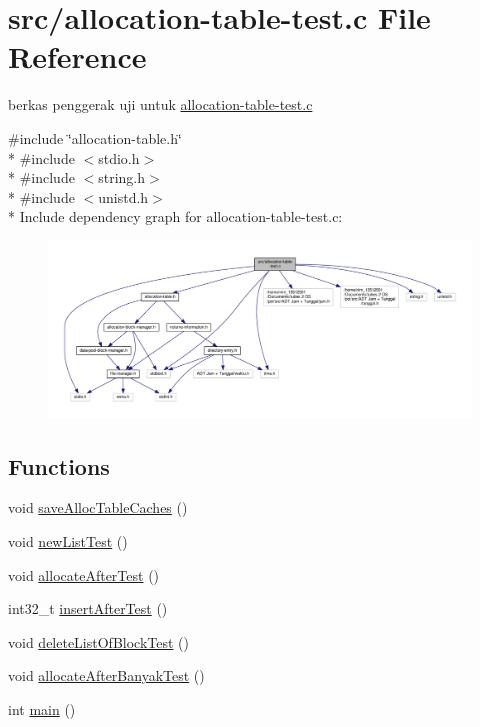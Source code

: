 \hypertarget{allocation-table-test_8c}{\section{src/allocation-\/table-\/test.c File Reference}
\label{allocation-table-test_8c}
}


berkas penggerak uji untuk \hyperlink{allocation-table-test_8c}{allocation-\/table-\/test.\-c}  


{\ttfamily \#include \char`\"{}allocation-\/table.\-h\char`\"{}}\\*
{\ttfamily \#include $<$stdio.\-h$>$}\\*
{\ttfamily \#include $<$string.\-h$>$}\\*
{\ttfamily \#include $<$unistd.\-h$>$}\\*
Include dependency graph for allocation-\/table-\/test.c\-:\nopagebreak
\begin{figure}[H]
\begin{center}
\leavevmode
\includegraphics[width=350pt]{allocation-table-test_8c__incl}
\end{center}
\end{figure}
\subsection*{Functions}
\begin{DoxyCompactItemize}
\item 
void \hyperlink{allocation-table-test_8c_a20af25d3b441d1f25e4830ee2173480c}{save\-Alloc\-Table\-Caches} ()
\item 
void \hyperlink{allocation-table-test_8c_ae0bde2314239fb8dbf38c13fee0a68fe}{new\-List\-Test} ()
\item 
void \hyperlink{allocation-table-test_8c_a57b7cb9823d22ea55528c91e219b7dae}{allocate\-After\-Test} ()
\item 
int32\-\_\-t \hyperlink{allocation-table-test_8c_ae8700eb5d460019b20c7bdf4d0b5880b}{insert\-After\-Test} ()
\item 
void \hyperlink{allocation-table-test_8c_ace8f7db6e87db1e1e06efbc9437e58f1}{delete\-List\-Of\-Block\-Test} ()
\item 
void \hyperlink{allocation-table-test_8c_a9126bcf052408b8d8f30110d1a6c7627}{allocate\-After\-Banyak\-Test} ()
\item 
int \hyperlink{allocation-table-test_8c_ae66f6b31b5ad750f1fe042a706a4e3d4}{main} ()
\end{DoxyCompactItemize}
